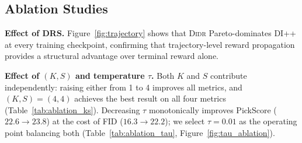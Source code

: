 \subsection{Ablation Studies}
\label{sec:ablation}
\vspace{-3mm}

\textbf{Effect of DRS.}
Figure~\ref{fig:trajectory} shows that \textsc{Didr} Pareto-dominates DI++ at every training checkpoint, confirming that trajectory-level reward propagation provides a structural advantage over terminal reward alone.

\textbf{Effect of $(K,S)$ and temperature $\tau$.}
Both $K$ and $S$ contribute independently: raising either from 1 to 4 improves all metrics, and $(K,S){=}(4,4)$ achieves the best result on all four metrics (Table~\ref{tab:ablation_ks}). Decreasing $\tau$ monotonically improves PickScore ($22.6{\to}23.8$) at the cost of FID ($16.3{\to}22.2$); we select $\tau{=}0.01$ as the operating point balancing both (Table~\ref{tab:ablation_tau}, Figure~\ref{fig:tau_ablation}).



\vspace{-3mm}
